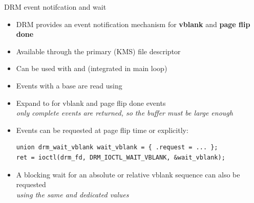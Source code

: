 \begin{frame}[fragile]{DRM event notifcation and wait}
  \begin{itemize}
  \item DRM provides an event notification mechanism for \textbf{vblank} and \textbf{page flip done}
  \item Available through the primary (KMS) file descriptor
  \item Can be used with  and  (integrated in main loop)
  \item Events with a  base are read using 
  \item Expand to  for vblank and page flip done events\\
    \textit{only complete events are returned, so the buffer must be large enough}
  \item Events can be requested at page flip time or explicitly:
  \begin{verbatim}
union drm_wait_vblank wait_vblank = { .request = ... };
ret = ioctl(drm_fd, DRM_IOCTL_WAIT_VBLANK, &wait_vblank);
  \end{verbatim}
  \item A blocking wait for an absolute or relative vblank sequence can also be requested\\
  \textit{using the same  and dedicated  values}
  \end{itemize}
\end{frame}

